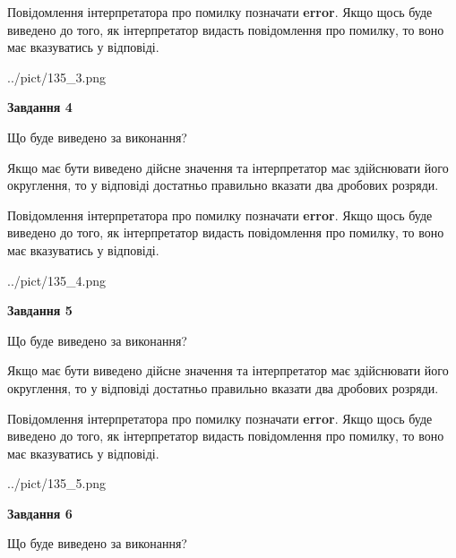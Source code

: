 \documentclass[12pt, ukrainian]{article}
\begin{document}
{\begin {Large}
Повідомлення інтерпретатора про помилку позначати \textbf{error}.
Якщо щось буде виведено до того, як інтерпретатор видасть повідомлення про помилку, 
то воно має вказуватись у відповіді. \par

\begin{center}
	{../pict/135_3.png}
\end{center}
\newpage

{\begin {center}\textbf{Завдання 4}\end {center}}\par
Що буде виведено за виконання? \par

Якщо має бути виведено дійсне значення та інтерпретатор має здійснювати його округлення, 
то у відповіді достатньо правильно вказати два дробових розряди.

Повідомлення інтерпретатора про помилку позначати \textbf{error}.
Якщо щось буде виведено до того, як інтерпретатор видасть повідомлення про помилку, 
то воно має вказуватись у відповіді. \par

\begin{center}
	{../pict/135_4.png}
\end{center}
\newpage

{\begin {center}\textbf{Завдання 5}\end {center}}\par
Що буде виведено за виконання? \par

Якщо має бути виведено дійсне значення та інтерпретатор має здійснювати його округлення, 
то у відповіді достатньо правильно вказати два дробових розряди.

Повідомлення інтерпретатора про помилку позначати \textbf{error}.
Якщо щось буде виведено до того, як інтерпретатор видасть повідомлення про помилку, 
то воно має вказуватись у відповіді. \par

\begin{center}
	{../pict/135_5.png}
\end{center}
\newpage

{\begin {center}\textbf{Завдання 6}\end {center}}\par
Що буде виведено за виконання? \par


\end{Large}}
\end{document}
